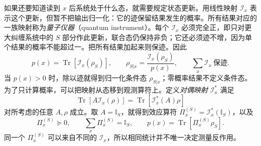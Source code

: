 如果还要知道读到 $x$ 后系统处于什么态，就需要规定状态更新。用线性映射 $\mathcal I_x$ 表示这个更新，但暂不把输出归一化：它的迹保留结果发生的概率。所有结果对应的一族映射称为\emph{量子仪器}（quantum instrument）。每个 $\mathcal I_x$ 必须完全正，即只对更大纠缠系统中的 $S$ 部分作此更新，联合态仍保持非负；它还必须迹不增，因为单个结果的概率不能超过一。把所有结果加起来则保迹。因此
\begin{equation}
\boxed{
p(x)=\operatorname{Tr}[\mathcal I_x(\rho_S)],
\qquad
\rho_{S|x}=\frac{\mathcal I_x(\rho_S)}{p(x)},
\qquad
\sum_x\mathcal I_x\ \text{保迹}.}
\label{eq:quantum_instrument_probability_definition}
\end{equation}
当 $p(x)>0$ 时，除以迹就得到归一化条件态 $\rho_{S|x}$；零概率结果不定义条件态。为了只计算概率，可以把映射从态移到观测算符上。定义\emph{对偶映射} $\mathcal I_x^*$ 满足
\[
\operatorname{Tr}[A\mathcal I_x(\rho)]
=\operatorname{Tr}[\mathcal I_x^*(A)\rho]
\]
对所考虑的任意 $A,\rho$ 成立。取 $A=\mathbb I_S$，就得到效应算符 $\Pi_x^{(S)}=\mathcal I_x^*(\mathbb I_S)$，以及
\begin{equation}
\boxed{
\Pi_x^{(S)}\succeq0,
\qquad
\sum_x\Pi_x^{(S)}=\mathbb I_S,
\qquad
p(x)=\operatorname{Tr}[\Pi_x^{(S)}\rho_S].}
\label{eq:abstract_instrument_to_povm}
\end{equation}
同一个 $\Pi_x^{(S)}$ 可以来自不同的 $\mathcal I_x$，所以相同统计并不唯一决定测量反作用。

